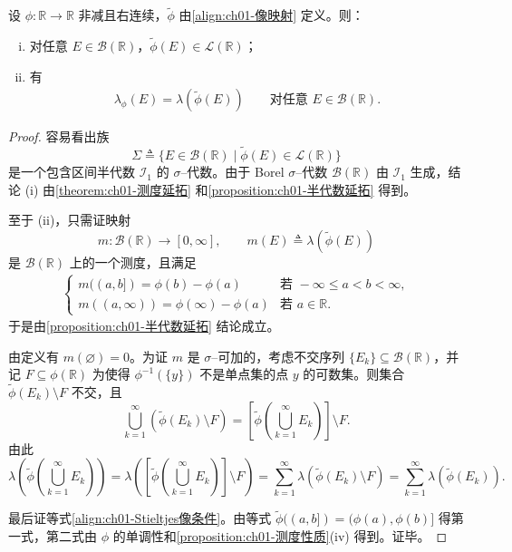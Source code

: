 \documentclass[../../main.tex]{subfiles}%
\begin{document}
\begin{proposition}\label{proposition:ch01-Stieltjes像}\label{proposition:ch01-Radon投影}
设 $\phi:\mathbb{R}\to\mathbb{R}$ 非减且右连续，$\widetilde{\phi}$ 由\eqref{align:ch01-像映射} 定义。则：
\begin{enumerate}[(i)]
\item 对任意 $E\in\mathcal{B}(\mathbb{R})$，$\widetilde{\phi}(E)\in\mathcal{L}(\mathbb{R})$；
\item 有
\begin{align}
\lambda_\phi(E)=\lambda(\widetilde{\phi}(E))\qquad\text{对任意 }E\in\mathcal{B}(\mathbb{R}). \label{align:ch01-Stieltjes像公式}
\end{align}
\end{enumerate}
\end{proposition}

\begin{proof}
容易看出族
\[
\Sigma\triangleq \{E\in\mathcal{B}(\mathbb{R})\mid\widetilde{\phi}(E)\in\mathcal{L}(\mathbb{R})\}
\]
是一个包含区间半代数 $\mathcal{I}_1$ 的 $\sigma$--代数。由于 Borel $\sigma$--代数 $\mathcal{B}(\mathbb{R})$ 由 $\mathcal{I}_1$ 生成，结论 (i) 由\cref{theorem:ch01-测度延拓} 和\cref{proposition:ch01-半代数延拓} 得到。

至于 (ii)，只需证映射
\[
m:\mathcal{B}(\mathbb{R})\to[0,\infty],\qquad m(E)\triangleq \lambda(\widetilde{\phi}(E))
\]
是 $\mathcal{B}(\mathbb{R})$ 上的一个测度，且满足
\begin{align}
\begin{cases}
m((a,b])=\phi(b)-\phi(a) & \text{若 }-\infty\leqslant a<b<\infty,\\
m((a,\infty))=\phi(\infty)-\phi(a) & \text{若 }a\in\mathbb{R}.
\end{cases} \label{align:ch01-Stieltjes像条件}
\end{align}
于是由\cref{proposition:ch01-半代数延拓} 结论成立。

由定义有 $m(\varnothing )=0$。为证 $m$ 是 $\sigma$--可加的，考虑不交序列 $\{E_k\}\subseteq\mathcal{B}(\mathbb{R})$，并记 $F\subseteq\phi(\mathbb{R})$ 为使得 $\phi^{-1}(\{y\})$ 不是单点集的点 $y$ 的可数集。则集合 $\widetilde{\phi}(E_k)\setminus F$ 不交，且
\[
\bigcup_{k=1}^\infty(\widetilde{\phi}(E_k)\setminus F)=\left[\widetilde{\phi}\left(\bigcup_{k=1}^\infty E_k\right)\right]\setminus F.
\]
由此
\[
\lambda\left(\widetilde{\phi}\left(\bigcup_{k=1}^\infty E_k\right)\right)
=\lambda\left(\left[\widetilde{\phi}\left(\bigcup_{k=1}^\infty E_k\right)\right]\setminus F\right)
=\sum_{k=1}^\infty\lambda(\widetilde{\phi}(E_k)\setminus F)
=\sum_{k=1}^\infty\lambda(\widetilde{\phi}(E_k)).
\]

最后证等式\eqref{align:ch01-Stieltjes像条件}。由等式 $\widetilde{\phi}((a,b])=(\phi(a),\phi(b)]$ 得第一式，第二式由 $\phi$ 的单调性和\cref{proposition:ch01-测度性质}(iv) 得到。证毕。
\end{proof}
\end{document}
